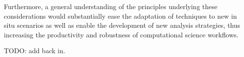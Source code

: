 Furthermore, a general understanding of the principles underlying these considerations would substantially ease the adaptation of techniques to new in situ scenarios as well as enable the development of new analysis strategies, thus increasing the productivity and robustness of computational science workflows.

 TODO: add back in.





